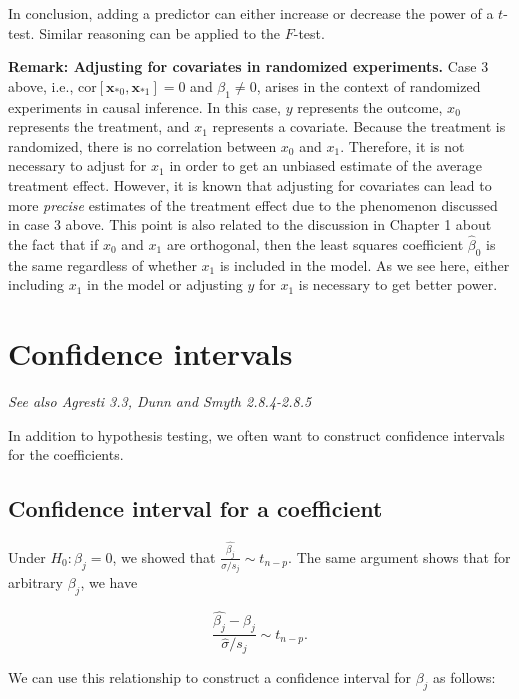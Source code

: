 \documentclass[
  11pt,
  letterpaper,
  oneside]{book}
\theoremstyle{definition}
\theoremstyle{plain}
\theoremstyle{plain}
\theoremstyle{plain}
\theoremstyle{remark}
\begin{document}
In conclusion, adding a predictor can either increase or decrease the
power of a \(t\)-test. Similar reasoning can be applied to the
\(F\)-test.

\textbf{Remark: Adjusting for covariates in randomized experiments.}
Case 3 above, i.e.,
\(\text{cor}[\boldsymbol{x}_{*0}, \boldsymbol{x}_{*1}] = 0\) and
\(\beta_1 \neq 0\), arises in the context of randomized experiments in
causal inference. In this case, \(y\) represents the outcome, \(x_0\)
represents the treatment, and \(x_1\) represents a covariate. Because
the treatment is randomized, there is no correlation between \(x_0\) and
\(x_1\). Therefore, it is not necessary to adjust for \(x_1\) in order
to get an unbiased estimate of the average treatment effect. However, it
is known that adjusting for covariates can lead to more \emph{precise}
estimates of the treatment effect due to the phenomenon discussed in
case 3 above. This point is also related to the discussion in Chapter 1
about the fact that if \(x_0\) and \(x_1\) are orthogonal, then the
least squares coefficient \(\widehat \beta_0\) is the same regardless of
whether \(x_1\) is included in the model. As we see here, either
including \(x_1\) in the model or adjusting \(y\) for \(x_1\) is
necessary to get better power.

\hypertarget{confidence-intervals}{%
\chapter{Confidence intervals}\label{confidence-intervals}}

\emph{See also Agresti 3.3, Dunn and Smyth 2.8.4-2.8.5}

In addition to hypothesis testing, we often want to construct confidence
intervals for the coefficients.

\hypertarget{confidence-interval-for-a-coefficient}{%
\section{Confidence interval for a
coefficient}\label{confidence-interval-for-a-coefficient}}

Under \(H_0: \beta_j = 0\), we showed that
\(\frac{\widehat{\beta_j}}{\widehat{\sigma}/s_j} \sim t_{n-p}\). The
same argument shows that for arbitrary \(\beta_j\), we have

\[
\frac{\widehat{\beta_j} - \beta_j}{\widehat{\sigma}/s_j} \sim t_{n-p}.
\]

We can use this relationship to construct a confidence interval for
\(\beta_j\) as follows:
\end{document}
